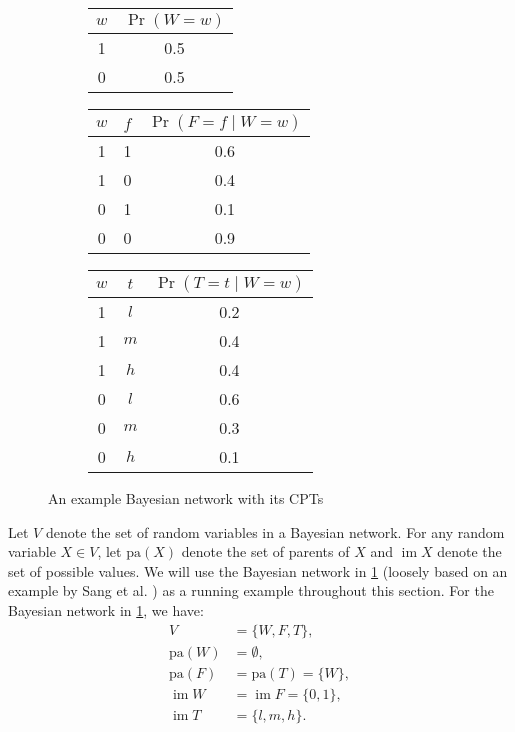 \documentclass{article}
\theoremstyle{definition}
\theoremstyle{remark}
\DeclareMathOperator{\im}{im}
\begin{document}
\begin{figure}
  \centering
  \begin{subfigure}{0.2\textwidth}
    \centering
  \end{subfigure}%
  \begin{subfigure}{0.8\textwidth}
    \centering
    \begin{tabular}[t]{cc}
      \toprule
      $w$ & $\Pr(W = w)$ \\
      \midrule
      1 & 0.5 \\
      0 & 0.5 \\
      \bottomrule
    \end{tabular}
    \begin{tabular}[t]{ccc}
      \toprule
      $w$ & $f$ & $\Pr(F = f \mid W = w)$ \\
      \midrule
      1 & 1 & 0.6 \\
      1 & 0 & 0.4 \\
      0 & 1 & 0.1 \\
      0 & 0 & 0.9 \\
      \bottomrule
    \end{tabular}
    \begin{tabular}[t]{ccc}
      \toprule
      $w$ & $t$ & $\Pr(T = t \mid W = w)$ \\
      \midrule
      1 & $l$ & 0.2 \\
      1 & $m$ & 0.4 \\
      1 & $h$ & 0.4 \\
      0 & $l$ & 0.6 \\
      0 & $m$ & 0.3 \\
      0 & $h$ & 0.1 \\
      \bottomrule
    \end{tabular}
  \end{subfigure}
  \caption{An example Bayesian network with its CPTs}
  \label{fig:example_bn}
\end{figure}

Let $V$ denote the set of random variables in a Bayesian network. For any random
variable $X \in V$, let $\mathrm{pa}(X)$ denote the set of parents of $X$ and
$\im X$ denote the set of possible values. We will use the Bayesian network in
\cref{fig:example_bn} (loosely based on an example by Sang et al.
\cite{DBLP:conf/aaai/SangBK05}) as a running example throughout this section.
For the Bayesian network in \cref{fig:example_bn}, we have:
\begin{align*}
  V &= \{ W, F, T \}, \\
  \mathrm{pa}(W) &= \emptyset, \\
  \mathrm{pa}(F) &= \mathrm{pa}(T) = \{ W \}, \\
  \im W &= \im F = \{ 0, 1 \}, \\
  \im T &= \{ l, m, h \}.
\end{align*}
\end{document}
